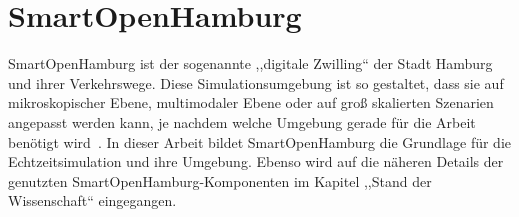 %
%
\section{SmartOpenHamburg}\label{sec:smart-open-hamburg}

SmartOpenHamburg ist der sogenannte ,,digitale Zwilling`` der Stadt Hamburg und ihrer Verkehrswege.
Diese Simulationsumgebung ist so gestaltet, dass sie auf mikroskopischer Ebene, multimodaler Ebene oder auf groß skalierten Szenarien angepasst werden kann, je nachdem welche Umgebung gerade für die Arbeit benötigt wird~\cite{Lenfers-MMT-2021}.
In dieser Arbeit bildet SmartOpenHamburg die Grundlage für die Echtzeitsimulation und ihre Umgebung.
Ebenso wird auf die näheren Details der genutzten SmartOpenHamburg-Komponenten im Kapitel ,,Stand der Wissenschaft`` eingegangen.

